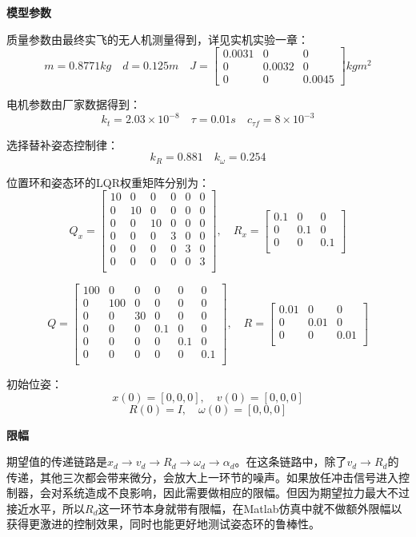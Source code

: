   \textbf{模型参数}

  质量参数由最终实飞的无人机测量得到，详见实机实验一章：
  $$m=0.8771kg \quad d=0.125m \quad J=\begin{bmatrix}
    0.0031   &      0  &       0\\
    0 &   0.0032      &   0\\
    0  &       0   & 0.0045
  \end{bmatrix}kg m^2$$

  电机参数由厂家数据得到：
  $$k_t=2.03\times 10^{-8} \quad 
  \tau=0.01s \quad
  c_{\tau f}=8\times 10^{-3}$$

  选择替补姿态控制律：
  $$k_R=0.881 \quad k_\omega=0.254$$

  位置环和姿态环的LQR权重矩阵分别为：
  $$Q_x=\begin{bmatrix}
    10&0&0&0&0&0\\
    0&10&0&0&0&0\\
    0&0&10&0&0&0\\
    0&0&0&3&0&0\\
    0&0&0&0&3&0\\
    0&0&0&0&0&3\\
  \end{bmatrix}, \quad R_x=\begin{bmatrix}
    0.1 &0 &0\\
    0 &0.1 &0\\
    0 &0 &0.1\\
  \end{bmatrix}$$

  $$Q=\begin{bmatrix}
    100&0&0&0&0&0\\
    0&100&0&0&0&0\\
    0&0&30&0&0&0\\
    0&0&0&0.1&0&0\\
    0&0&0&0&0.1&0\\
    0&0&0&0&0&0.1\\
  \end{bmatrix}, \quad R=\begin{bmatrix}
    0.01 &0 &0\\
    0 &0.01 &0\\
    0 &0 &0.01\\
  \end{bmatrix}$$

  初始位姿：
  $$x(0)=[0,0,0],\quad v(0)=[0,0,0]$$
  $$R(0)=I , \quad \omega(0)=[0,0,0]$$

  \textbf{限幅}

  期望值的传递链路是$x_d \to v_d \to R_d \to \omega_d \to \alpha_d$。在这条链路中，除了$ v_d \to R_d$的传递，其他三次都会带来微分，会放大上一环节的噪声。如果放任冲击信号进入控制器，会对系统造成不良影响，因此需要做相应的限幅。但因为期望拉力最大不过接近水平，所以$R_d$这一环节本身就带有限幅，在Matlab仿真中就不做额外限幅以获得更激进的控制效果，同时也能更好地测试姿态环的鲁棒性。


